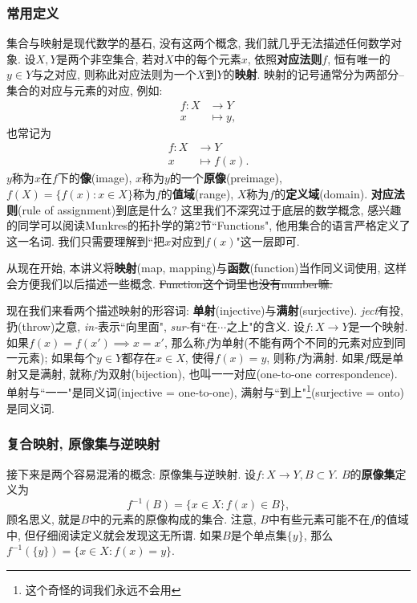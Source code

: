 \subsubsection*{常用定义}
集合与映射是现代数学的基石, 没有这两个概念, 我们就几乎无法描述任何数学对象. 设$X, Y$是两个非空集合, 若对$X$中的每个元素$x$, 依照\textbf{对应法则}$f$, 恒有唯一的$y \in Y$与之对应, 则称此对应法则为一个$X$到$Y$的\textbf{映射}. 映射的记号通常分为两部分--集合的对应与元素的对应, 例如:
\begin{align*}
    f:X &\to Y    \\
    x &\mapsto y, 
\end{align*}
也常记为
\begin{align*}
    f:X &\to Y    \\
    x &\mapsto f(x). 
\end{align*}
$y$称为$x$在$f$下的\textbf{像}(image), $x$称为$y$的一个\textbf{原像}(preimage), $f(X) = \{f(x): x\in X\}$称为$f$的\textbf{值域}(range), $X$称为$f$的\textbf{定义域}(domain).  
\textbf{对应法则}(rule of assignment)到底是什么? 这里我们不深究过于底层的数学概念, 感兴趣的同学可以阅读Munkres的拓扑学的第2节``Functions", 他用集合的语言严格定义了这一名词. 我们只需要理解到``把$x$对应到$f(x)$"这一层即可. \\
\begin{remark}
    从现在开始, 本讲义将\textbf{映射}(map, mapping)与\textbf{函数}(function)当作同义词使用, 这样会方便我们以后描述一些概念. \sout{Function这个词里也没有number嘛.}
\end{remark}
现在我们来看两个描述映射的形容词: \textbf{单射}(injective)与\textbf{满射}(surjective).
\textit{ject}有投, 扔(throw)之意, \textit{in-}表示``向里面", \textit{sur-}有``在$\cdots$之上"的含义. 设$f:X \to Y$是一个映射. 如果$f(x)=f(x') \implies x=x'$, 那么称$f$为单射(不能有两个不同的元素对应到同一元素); 如果每个$y \in Y$都存在$x \in X$, 使得$f(x) = y$, 则称$f$为满射. 如果$f$既是单射又是满射, 就称$f$为双射(bijection), 也叫一一对应(one-to-one correspondence). 单射与``一一"是同义词(injective = one-to-one), 
满射与``到上"\footnote{这个奇怪的词我们永远不会用}(surjective = onto)是同义词. 

\subsubsection*{复合映射, 原像集与逆映射}
接下来是两个容易混淆的概念: 原像集与逆映射. 设$f:X \to Y, B \subset Y$.
$B$的\textbf{原像集}定义为$$f^{-1}(B) = \{x \in X: f(x) \in B\},$$
顾名思义, 就是$B$中的元素的原像构成的集合. 注意, $B$中有些元素可能不在$f$的值域中, 但仔细阅读定义就会发现这无所谓. 如果$B$是个单点集$\{y\}$, 那么$f^{-1}(\{y\}) = \{x \in X: f(x) = y\}$.

